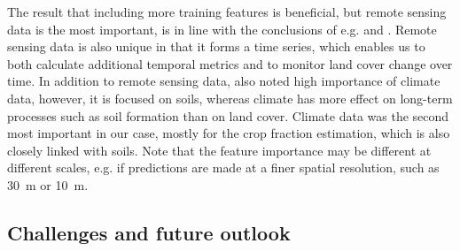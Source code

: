 \documentclass[review,authoryear,3p]{elsarticle}
\begin{document}
The result that including more training features is beneficial, but remote sensing data is the most important, is in line with the conclusions of e.g. \citet{li_monitoring_2018} and \citet{hengl_soilgrids250m_2017}.
Remote sensing data is also unique in that it forms a time series, which enables us to both calculate additional temporal metrics and to monitor land cover change over time.
In addition to remote sensing data, \citet{hengl_soilgrids250m_2017} also noted high importance of climate data, however, it is focused on soils, whereas climate has more effect on long-term processes such as soil formation than on land cover.
Climate data was the second most important in our case, mostly for the crop fraction estimation, which is also closely linked with soils.
Note that the feature importance may be different at different scales, e.g. if predictions are made at a finer spatial resolution, such as 30~m or 10~m.

\subsection{Challenges and future outlook}
\end{document}
